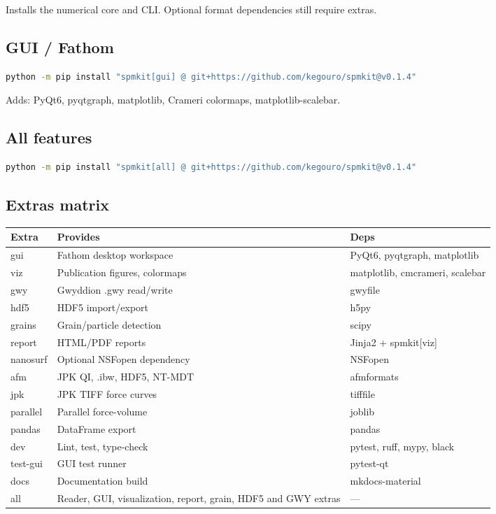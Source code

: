 \documentclass[a4paper,11pt]{article}
\begin{document}
Installs the numerical core and CLI. Optional format dependencies still require extras.

\subsection{GUI / Fathom}
\begin{lstlisting}[language=bash]
python -m pip install "spmkit[gui] @ git+https://github.com/kegouro/spmkit@v0.1.4"
\end{lstlisting}

Adds: PyQt6, pyqtgraph, matplotlib, Crameri colormaps, matplotlib-scalebar.

\subsection{All features}
\begin{lstlisting}[language=bash]
python -m pip install "spmkit[all] @ git+https://github.com/kegouro/spmkit@v0.1.4"
\end{lstlisting}

\subsection{Extras matrix}

\begin{longtable}{@{}>{\ttfamily}l p{7cm} l@{}}
\toprule
\textnormal{Extra} & \textnormal{Provides} & \textnormal{Deps} \\
\midrule
gui    & Fathom desktop workspace & PyQt6, pyqtgraph, matplotlib \\
viz    & Publication figures, colormaps & matplotlib, cmcrameri, scalebar \\
gwy    & Gwyddion .gwy read/write & gwyfile \\
hdf5   & HDF5 import/export & h5py \\
grains & Grain/particle detection & scipy \\
report & HTML/PDF reports & Jinja2 + spmkit[viz] \\
nanosurf & Optional NSFopen dependency & NSFopen \\
afm    & JPK QI, .ibw, HDF5, NT-MDT & afmformats \\
jpk    & JPK TIFF force curves & tifffile \\
parallel & Parallel force-volume & joblib \\
pandas & DataFrame export & pandas \\
dev    & Lint, test, type-check & pytest, ruff, mypy, black \\
test-gui & GUI test runner & pytest-qt \\
docs   & Documentation build & mkdocs-material \\
all    & Reader, GUI, visualization, report, grain, HDF5 and GWY extras & --- \\
\bottomrule
\end{longtable}
\end{document}
